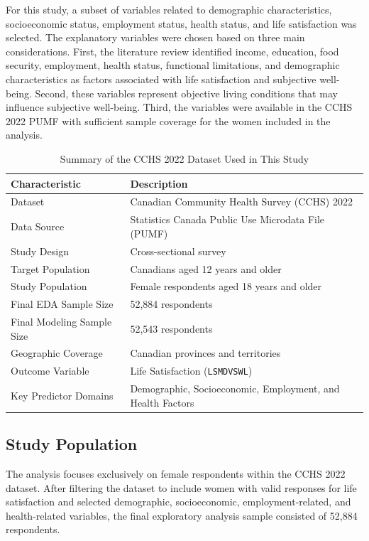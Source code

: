 \documentclass[12pt]{article}
\begin{document}
For this study, a subset of variables related to demographic characteristics, socioeconomic status, employment status, health status, and life satisfaction was selected. The explanatory variables were chosen based on three main considerations. First, the literature review identified income, education, food security, employment, health status, functional limitations, and demographic characteristics as factors associated with life satisfaction and subjective well-being. Second, these variables represent objective living conditions that may influence subjective well-being. Third, the variables were available in the CCHS 2022 PUMF with sufficient sample coverage for the women included in the analysis.

\begin{table}[h]
\centering
\caption{Summary of the CCHS 2022 Dataset Used in This Study}
\begin{tabular}{p{} p{}}
\hline
\textbf{Characteristic} & \textbf{Description} \\
\hline
Dataset & Canadian Community Health Survey (CCHS) 2022 \\
Data Source & Statistics Canada Public Use Microdata File (PUMF) \\
Study Design & Cross-sectional survey \\
Target Population & Canadians aged 12 years and older \\
Study Population & Female respondents aged 18 years and older \\
Final EDA Sample Size & 52,884 respondents \\
Final Modeling Sample Size & 52,543 respondents \\
Geographic Coverage & Canadian provinces and territories \\
Outcome Variable & Life Satisfaction (\texttt{LSMDVSWL}) \\
Key Predictor Domains & Demographic, Socioeconomic, Employment, and Health Factors \\
\hline
\end{tabular}
\end{table}



\subsection{Study Population}

The analysis focuses exclusively on female respondents within the CCHS 2022 dataset. After filtering the dataset to include women with valid responses for life satisfaction and selected demographic, socioeconomic, employment-related, and health-related variables, the final exploratory analysis sample consisted of 52,884 respondents.
\end{document}

